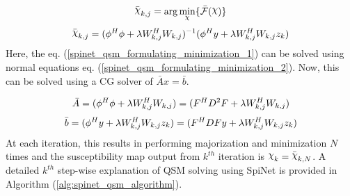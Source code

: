 \documentclass[sn-vancouver,Numbered]{sn-jnl}%
\DeclareRobustCommand{\rchi}{{\mathpalette\irchi\relax}}
\newcommand{\irchi}[2]{\raisebox{\depth}{$#1\chi$}}
\begin{document}
\begin{equation}
\label{spinet_qsm_formulating_minimization_1}
\bar\rchi_{k,j}=\arg \min_{\rchi}\{\bar{\mathcal{F}}(\rchi)\}
\end{equation}
\vspace{-1mm}
\begin{equation} 
\label{spinet_qsm_formulating_minimization_2}
    \bar\rchi_{k,j}=(\phi ^{H} \phi +\lambda W_{k,j}^{H}W_{k,j})^{-1}(\phi ^{H} y +\lambda W_{k,j}^{H}W_{k,j} z_{k})
\end{equation}
\vspace{1mm}
\noindent  Here, the eq. (\ref{spinet_qsm_formulating_minimization_1}) can be solved using normal equations eq. (\ref{spinet_qsm_formulating_minimization_2}). Now, this can be solved using a CG solver of $\bar A x=\bar b$.

\begin{equation}
\scriptsize
\bar{A}=(\phi ^{H} \phi +\lambda W_{k,j}^{H}W_{k,j})=(F^HD^2F+\lambda W_{k,j}^HW_{k,j})
\end{equation}
\vspace{-1mm}
\begin{equation}
\scriptsize
\bar{b}=(\phi ^{H} y +\lambda W_{k,j}^{H}W_{k,j} z_{k})=(F^HDFy+\lambda W_{k,j}^HW_{k,j}z_{k})        
\end{equation}
\vspace{1mm}
\noindent At each iteration, this results in performing majorization and minimization $N$ times and the susceptibility map output from $k^{th}$ iteration is $\rchi_{k}=\bar\rchi_{k,N}$. A detailed $k^{th}$ step-wise explanation of QSM solving using SpiNet is provided in Algorithm (\ref{alg:spinet_qsm_algorithm}).
\end{document}
